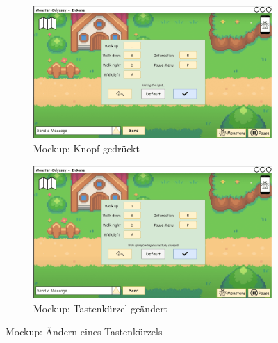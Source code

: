 \begin{figure}[H]
    \centering
    \begin{subfigure}[b]{0.4\textwidth}
        \includegraphics[width=\textwidth]{images/mockups/Bonusfeatures/Keybindings/KeybindingsSettingsWaitingForInput.png}
        \caption{Mockup: Knopf gedrückt}
        \label{fig: Knopf gedrückt}
    \end{subfigure}
    \hfill
    \begin{subfigure}[b]{0.4\textwidth}
        \includegraphics[width=\textwidth]{images/mockups/Bonusfeatures/Keybindings/KeybindingsSettingsChanged.png}
        \caption{Mockup: Tastenkürzel geändert}
        \label{fig: Tastenkürzel geändert}
    \end{subfigure}
    \caption{Mockup: Ändern eines Tastenkürzels}
    \label{fig: Ändern eines Tastenkürzels}
\end{figure}
